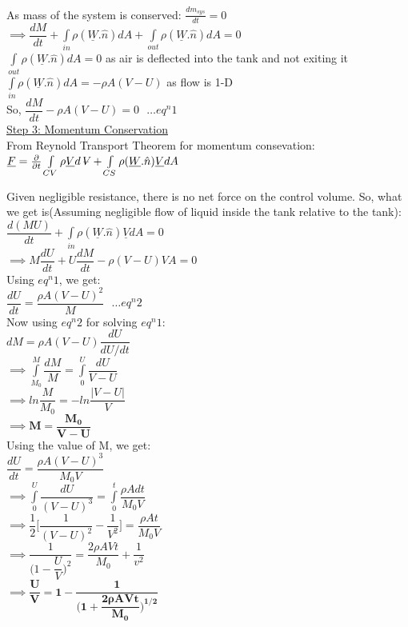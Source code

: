 \documentclass{article}
\newcommand{\volume}{\mathop{\ooalign{\hfil$V$\hfil\cr\kern0.08em--\hfil\cr}}\nolimits}
\begin{document}
As mass of the system is conserved: $\frac{dm_{sys}}{dt}=0$ \\ 
$\implies \dfrac{dM}{dt} + \int\limits_{in} \rho (\underline{W}.\hat{n})dA + \int\limits_{out} \rho (\underline{W}.\hat{n})dA=0 $\\

$\int\limits_{out}\rho (\underline{W}.\hat{n})dA=0$ as air is deflected into the tank and not exiting it\\ 

$\int\limits_{in}\rho (\underline{W}.\hat{n})dA= -\rho A(V- U)$ as flow is 1-D\\
So, $\dfrac{dM}{dt}- \rho A(V- U)=0 \ \ \  \hdots eq^n 1$ \\
\newpage
\noindent \underline{Step 3: Momentum Conservation}\\

\noindent From Reynold Transport Theorem for momentum consevation:\ 
$\underline{F}= \frac{\partial}{\partial t} \int\limits_{CV} \rho\underline{V} d\volume + \int\limits_{CS} \rho (\underline{W}.\hat{n})\underline{V}dA $

Given negligible resistance, there is no net force on the control volume. So, what we get is(Assuming negligible flow of liquid inside the tank relative to the tank): \\
$\dfrac{d(MU)}{dt}+ \int\limits_{in} \rho (\underline{W}.\hat{n})\underline{V}dA=0$\\
$\implies M\dfrac{dU}{dt}+ U\dfrac{dM}{dt}- \rho(V-U)VA=0 $\\
Using  $eq^n 1$, we get:\\

$\dfrac{dU}{dt}= \dfrac{\rho A(V-U)^2}{M}  \ \ \ \hdots eq^n 2$ \\

Now using $eq^n 2$ for solving $eq^n 1$:\\

$dM= \rho A (V-U) \dfrac{dU}{dU/dt} $\\
$\implies \int\limits_{M_0}^M\dfrac{dM}{M}= \int\limits_0^{U}\dfrac{dU}{V-U} $\\
$\implies ln\dfrac{M}{M_0}=- ln\dfrac{\rvert V-U \rvert}{V}$\\
\bigbreak
\noindent $\implies \mathbf{M=\dfrac{M_0} {V-U} }$\\
\bigbreak
\noindent Using the value of M, we get:\\
$\dfrac{dU}{dt}= \dfrac{\rho A(V-U)^3}{M_0V}$\\
$\implies \int\limits_0^U\dfrac{dU}{(V-U)^3}=\int\limits_0^t \dfrac{\rho Adt}{M_0V}$\\
$\implies \dfrac{1}{2}\Big[\dfrac{1}{(V-U)^2}- \dfrac{1}{V^2}\Big]=\dfrac{\rho At}{M_0V}$\\
$\implies \dfrac{1}{\bigg(1-\dfrac{U}{V} \bigg)^2}= \dfrac{2\rho AVt}{M_0}+ \dfrac{1}{v^2}$\\
\bigbreak
$\mathbf{\implies \dfrac{U}{V}= 1-\dfrac{1}{\bigg( 1+ \dfrac{2\rho AVt}{M_0}\bigg)^{1/2}}}$
\end{document}
